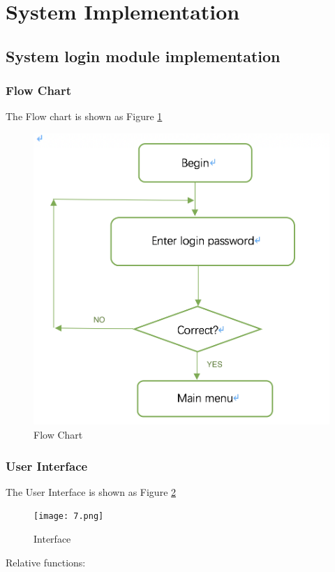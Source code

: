 \section{System Implementation}
\subsection{System login module implementation}
\subsubsection{Flow Chart}
The Flow chart is shown as Figure \ref{fig:p6}
\begin{figure}[H]
    \centering
    \includegraphics[width=\textwidth]{6.png}
    \caption{Flow Chart}
    \label{fig:p6}
\end{figure}
\subsubsection{User Interface}
The User Interface is shown as Figure \ref{fig:p7}
\begin{figure}[H]
    \centering
    \texttt{[image: 7.png]}
    \caption{Interface}
    \label{fig:p7}
\end{figure}
Relative functions:

